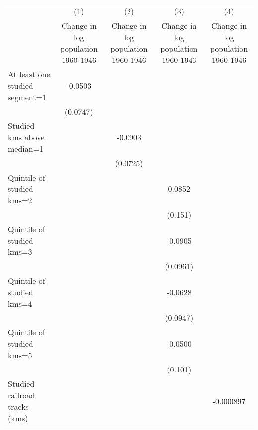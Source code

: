 {
\def\sym#1{\ifmmode^{#1}\else\(^{#1}\)\fi}
\begin{tabular}{l*{4}{c}}
\hline\hline
                    &\multicolumn{1}{c}{(1)}&\multicolumn{1}{c}{(2)}&\multicolumn{1}{c}{(3)}&\multicolumn{1}{c}{(4)}\\
                    &\multicolumn{1}{c}{Change in log population 1960-1946}&\multicolumn{1}{c}{Change in log population 1960-1946}&\multicolumn{1}{c}{Change in log population 1960-1946}&\multicolumn{1}{c}{Change in log population 1960-1946}\\
\hline
At least one studied segment=1&     -0.0503         &                     &                     &                     \\
                    &    (0.0747)         &                     &                     &                     \\
[1em]
Studied kms above median=1&                     &     -0.0903         &                     &                     \\
                    &                     &    (0.0725)         &                     &                     \\
[1em]
Quintile of studied kms=2&                     &                     &      0.0852         &                     \\
                    &                     &                     &     (0.151)         &                     \\
[1em]
Quintile of studied kms=3&                     &                     &     -0.0905         &                     \\
                    &                     &                     &    (0.0961)         &                     \\
[1em]
Quintile of studied kms=4&                     &                     &     -0.0628         &                     \\
                    &                     &                     &    (0.0947)         &                     \\
[1em]
Quintile of studied kms=5&                     &                     &     -0.0500         &                     \\
                    &                     &                     &     (0.101)         &                     \\
[1em]
Studied railroad tracks (kms)&                     &                     &                     &   -0.000897         \\

\end{tabular}}
